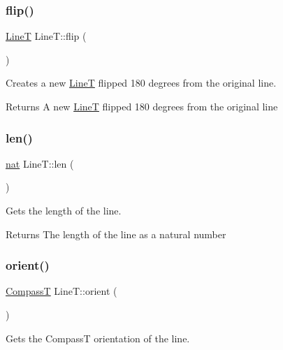 \subsubsection{\texorpdfstring{flip()}{flip()}}
{\footnotesize\ttfamily \mbox{\hyperlink{class_line_t}{LineT}} Line\+T\+::flip (\begin{DoxyParamCaption}{ }\end{DoxyParamCaption})}



Creates a new \mbox{\hyperlink{class_line_t}{LineT}} flipped 180 degrees from the original line. 

\begin{DoxyReturn}{Returns}
A new \mbox{\hyperlink{class_line_t}{LineT}} flipped 180 degrees from the original line 
\end{DoxyReturn}
\mbox{\label{class_line_t_a89f2a51bee8acb60e6a0aa1c52a195f7}} 
\subsubsection{\texorpdfstring{len()}{len()}}
{\footnotesize\ttfamily \mbox{\hyperlink{_path_a_d_t_8h_a56638ee9d162e8cce3a15f92d2023d6e}{nat}} Line\+T\+::len (\begin{DoxyParamCaption}{ }\end{DoxyParamCaption})}



Gets the length of the line. 

\begin{DoxyReturn}{Returns}
The length of the line as a natural number 
\end{DoxyReturn}
\mbox{\label{class_line_t_a27377bf25d8fc96b2c25affabd28d72d}} 
\subsubsection{\texorpdfstring{orient()}{orient()}}
{\footnotesize\ttfamily \mbox{\hyperlink{_map_types_8h_a02f3db508dc0c595c2572f474f14b2fa}{CompassT}} Line\+T\+::orient (\begin{DoxyParamCaption}{ }\end{DoxyParamCaption})}



Gets the CompassT orientation of the line. 

